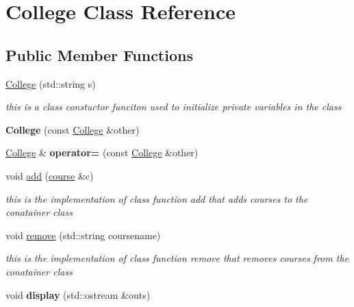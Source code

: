 \hypertarget{class_college}{}\section{College Class Reference}
\label{class_college}
\subsection*{Public Member Functions}
\begin{DoxyCompactItemize}
\item 
\hyperlink{class_college_adabaf4087355e83f9f7d39f1e1498b41}{College} (std\+::string s)
\begin{DoxyCompactList}\small\item\em this is a class constuctor funciton used to initialize private variables in the class \end{DoxyCompactList}\item 
\mbox{\label{class_college_ad007ad488e5a7ef986114080d0c8e101}} 
{\bfseries College} (const \hyperlink{class_college}{College} \&other)
\item 
\mbox{\label{class_college_af2194c9b37f80d13dc3fdba6784b18e8}} 
\hyperlink{class_college}{College} \& {\bfseries operator=} (const \hyperlink{class_college}{College} \&other)
\item 
void \hyperlink{class_college_a67fd1d8970b46b24ce2e0dd72598a22f}{add} (\hyperlink{classcourse}{course} \&c)
\begin{DoxyCompactList}\small\item\em this is the implementation of class function add that adds courses to the conatainer class \end{DoxyCompactList}\item 
void \hyperlink{class_college_a4d2ae513b36e6421fb1ca2c08459cfe6}{remove} (std\+::string coursename)
\begin{DoxyCompactList}\small\item\em this is the implementation of class function remove that removes courses from the conatainer class \end{DoxyCompactList}\item 
\mbox{\label{class_college_a52ca0a164483cf5c05591cd0fb8b300c}} 
void {\bfseries display} (std\+::ostream \&outs)
\item 
\mbox{\label{class_college_a8a7a762611a1d7e00c453390d49355fd}} 

\end{DoxyCompactItemize}
